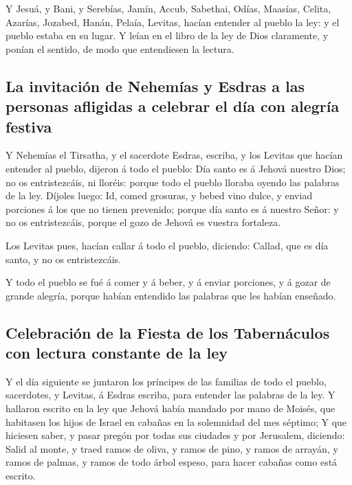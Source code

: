  Y Jesuá, y Bani, y Serebías, Jamín, Accub, Sabethai,
Odías, Maasías, Celita, Azarías, Jozabed, Hanán, Pelaía, Levitas, hacían
entender al pueblo la ley: y el pueblo estaba en su lugar.
 Y leían en el libro de la ley de Dios claramente, y
ponían el sentido, de modo que entendiesen la lectura.

\hypertarget{la-invitaciuxf3n-de-nehemuxedas-y-esdras-a-las-personas-afligidas-a-celebrar-el-duxeda-con-alegruxeda-festiva}{%
\subsection{La invitación de Nehemías y Esdras a las personas afligidas
a celebrar el día con alegría
festiva}\label{la-invitaciuxf3n-de-nehemuxedas-y-esdras-a-las-personas-afligidas-a-celebrar-el-duxeda-con-alegruxeda-festiva}}

 Y Nehemías el Tirsatha, y el sacerdote Esdras, escriba, y
los Levitas que hacían entender al pueblo, dijeron á todo el pueblo: Día
santo es á Jehová nuestro Dios; no os entristezcáis, ni lloréis: porque
todo el pueblo lloraba oyendo las palabras de la ley. 
Díjoles luego: Id, comed grosuras, y bebed vino dulce, y enviad
porciones á los que no tienen prevenido; porque día santo es á nuestro
Señor: y no os entristezcáis, porque el gozo de Jehová es vuestra
fortaleza.

 Los Levitas pues, hacían callar á todo el pueblo,
diciendo: Callad, que es día santo, y no os entristezcáis.

 Y todo el pueblo se fué á comer y á beber, y á enviar
porciones, y á gozar de grande alegría, porque habían entendido las
palabras que les habían enseñado.

\hypertarget{celebraciuxf3n-de-la-fiesta-de-los-tabernuxe1culos-con-lectura-constante-de-la-ley}{%
\subsection{Celebración de la Fiesta de los Tabernáculos con lectura
constante de la
ley}\label{celebraciuxf3n-de-la-fiesta-de-los-tabernuxe1culos-con-lectura-constante-de-la-ley}}

 Y el día siguiente se juntaron los príncipes de las
familias de todo el pueblo, sacerdotes, y Levitas, á Esdras escriba,
para entender las palabras de la ley.  Y hallaron escrito
en la ley que Jehová había mandado por mano de Moisés, que habitasen los
hijos de Israel en cabañas en la solemnidad del mes séptimo;
 Y que hiciesen saber, y pasar pregón por todas sus
ciudades y por Jerusalem, diciendo: Salid al monte, y traed ramos de
oliva, y ramos de pino, y ramos de arrayán, y ramos de palmas, y ramos
de todo árbol espeso, para hacer cabañas como está escrito.


